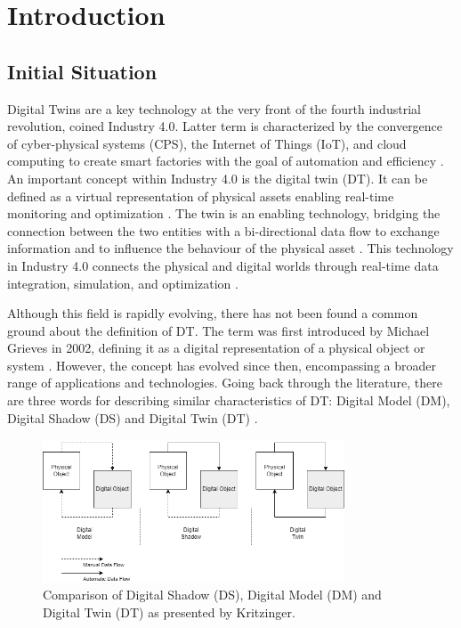 \chapter{Introduction}
\label{chap:introduction}

\section{Initial Situation}
Digital Twins are a key technology at the very front of the fourth industrial revolution, coined Industry 4.0.
Latter term is characterized by the convergence of cyber-physical systems (CPS), the Internet of Things (IoT), and cloud computing to create smart factories with the goal of automation and efficiency \parencite{Oztemel2020}. An important concept within Industry 4.0 is the digital twin (DT). It can be defined as a virtual representation of physical assets enabling real-time monitoring and optimization \parencite{Tao2018ijamt}. The twin is an enabling technology, bridging the connection between the two entities with a bi-directional data flow to exchange information and to influence the behaviour of the physical asset \parencite{grieves2014digital}. This technology in Industry 4.0 connects the physical and digital worlds through real-time data integration, simulation, and optimization \parencite{judijanto2024trends}.

Although this field is rapidly evolving, there has not been found a common ground about the definition of DT. The term was first introduced by Michael Grieves in 2002, defining it as a digital representation of a physical object or system \parencite{grieves2014digital}. However, the concept has evolved since then, encompassing a broader range of applications and technologies. Going back through the literature, there are three words for describing similar characteristics of DT: Digital Model (DM), Digital Shadow (DS) and Digital Twin (DT) \parencite{jones2020characterising,Zhang2021jmsy}.

\begin{figure}[htbp]
  \centering
  \includegraphics[width=0.8\textwidth]{figures/kritzinger.png}
  \caption{Comparison of Digital Shadow (DS), Digital Model (DM) and Digital Twin (DT) as presented by Kritzinger.}
  \label{fig:Kritzinger}
\end{figure}

